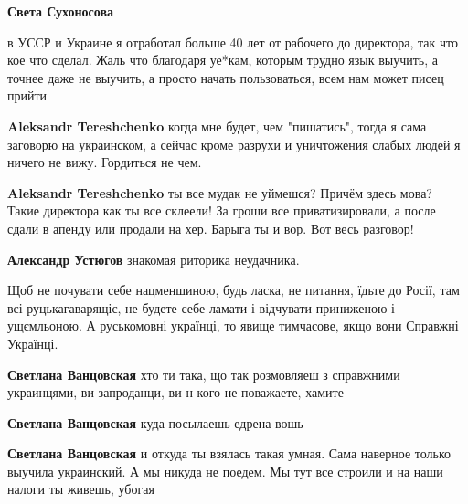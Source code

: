 \begin{itemize}
\begin{itemize}
\textbf{Света Сухоносова} 

в УССР и Украине я отработал больше 40 лет от рабочего до директора, так что
кое что сделал. Жаль что благодаря уе*кам, которым трудно язык выучить, а
точнее даже не выучить, а просто начать пользоваться, всем нам может писец
прийти


\textbf{Aleksandr Tereshchenko} когда мне будет, чем "пишатись", тогда я сама заговорю на украинском, а сейчас кроме разрухи и уничтожения слабых людей я ничего не вижу. Гордиться не чем.



\textbf{Aleksandr Tereshchenko} ты все мудак не уймешся? Причём здесь мова?
Такие директора как ты все склеели! За гроши все приватизировали, а после сдали
в апенду или продали на хер. Барыга ты и вор. Вот весь разговор!

\textbf{Александр Устюгов} знакомая риторика неудачника.

\end{itemize}


Щоб не почувати себе нацменшиною, будь ласка, не питання, їдьте до Росії, там
всі руцькагаварящіє, не будете себе ламати і відчувати приниженою і ущємльоною.
А руськомовні українці, то явище тимчасове, якщо вони Справжні Українці. 🤔

\begin{itemize}

\textbf{Светлана Ванцовская} хто ти така, що так розмовляеш з справжними
украинцями, ви запроданци, ви н кого не поважаете, хамите


\textbf{Светлана Ванцовская} куда посылаешь едрена вошь

\textbf{Светлана Ванцовская} и откуда ты взялась такая умная. Сама наверное только выучила украинский. А мы никуда не поедем. Мы тут все строили и на наши налоги ты живешь, убогая


\end{itemize}
\end{itemize}
